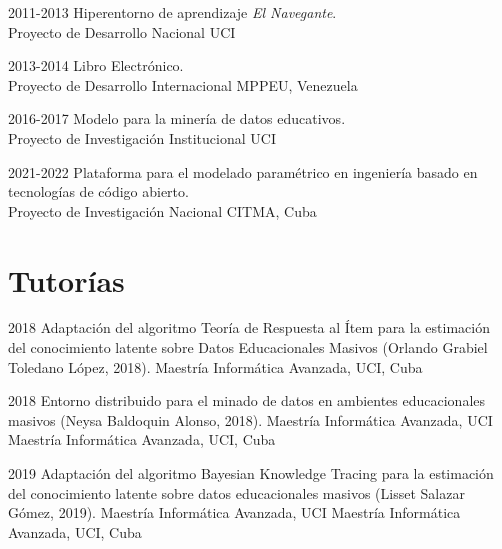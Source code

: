 \documentclass[letterpaper]{twentyonesecondcv} %
\begin{document}
{\begin{twentymid}
		\twentymiditem
		{2011-2013}
		{Hiperentorno de aprendizaje \textit{El Navegante}. \\Proyecto de Desarrollo Nacional}
		{UCI}
		
		\twentymiditem
		{2013-2014}
		{Libro Electrónico. \\Proyecto de Desarrollo Internacional}
		{MPPEU, Venezuela}
		
		\twentymiditem
		{2016-2017}
		{Modelo para la minería de datos educativos. \\Proyecto de Investigación Institucional}
		{UCI}
		
		\twentymiditem
		{2021-2022}
		{Plataforma para el modelado paramétrico en ingeniería basado en tecnologías de código abierto. \\Proyecto de Investigación Nacional}
		{CITMA, Cuba}
		
	\end{twentymid}

	\section{Tutorías}
	\begin{twentymid}
		\twentymiditem
		{2018}
		{Adaptación del algoritmo Teoría de Respuesta al Ítem para la estimación del conocimiento latente sobre Datos Educacionales Masivos (Orlando Grabiel Toledano López, 2018).}
		{Maestría Informática Avanzada, UCI, Cuba}
		
		\twentymiditem
		{2018}
		{Entorno distribuido para el minado de datos en ambientes educacionales masivos (Neysa Baldoquin Alonso, 2018). Maestría Informática Avanzada, UCI}
		{Maestría Informática Avanzada, UCI, Cuba}
		
		\twentymiditem
		{2019}
		{Adaptación del algoritmo Bayesian Knowledge Tracing para la estimación del conocimiento latente sobre datos educacionales masivos (Lisset Salazar Gómez, 2019). Maestría Informática Avanzada, UCI}
		{Maestría Informática Avanzada, UCI, Cuba}
		
	\end{twentymid}
}
	
\end{document}
